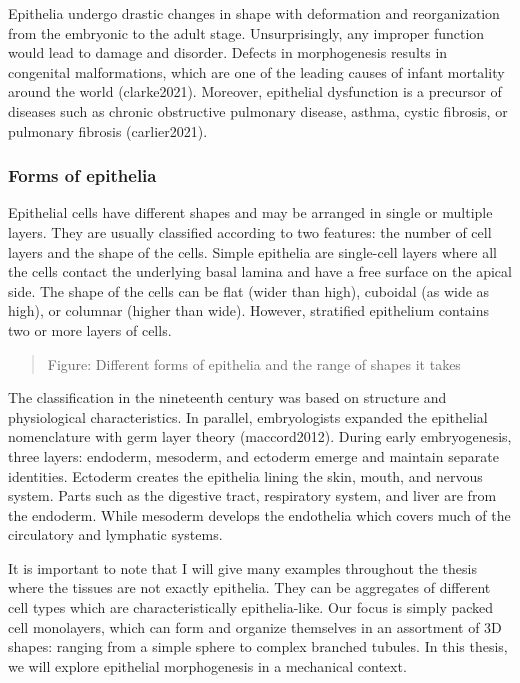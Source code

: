 \documentclass[
]{article}
\begin{document}
Epithelia undergo drastic changes in shape with deformation and
reorganization from the embryonic to the adult stage. Unsurprisingly,
any improper function would lead to damage and disorder. Defects in
morphogenesis results in congenital malformations, which are one of the
leading causes of infant mortality around the world (clarke2021).
Moreover, epithelial dysfunction is a precursor of diseases such as
chronic obstructive pulmonary disease, asthma, cystic fibrosis, or
pulmonary fibrosis (carlier2021).

\hypertarget{forms-of-epithelia}{%
\subsubsection{Forms of epithelia}\label{forms-of-epithelia}}

Epithelial cells have different shapes and may be arranged in single or
multiple layers. They are usually classified according to two features:
the number of cell layers and the shape of the cells. Simple epithelia
are single-cell layers where all the cells contact the underlying basal
lamina and have a free surface on the apical side. The shape of the
cells can be flat (wider than high), cuboidal (as wide as high), or
columnar (higher than wide). However, stratified epithelium contains two
or more layers of cells.

\begin{quote}
Figure: Different forms of epithelia and the range of shapes it takes
\end{quote}

The classification in the nineteenth century was based on structure and
physiological characteristics. In parallel, embryologists expanded the
epithelial nomenclature with germ layer theory (maccord2012). During
early embryogenesis, three layers: endoderm, mesoderm, and ectoderm
emerge and maintain separate identities. Ectoderm creates the epithelia
lining the skin, mouth, and nervous system. Parts such as the digestive
tract, respiratory system, and liver are from the endoderm. While
mesoderm develops the endothelia which covers much of the circulatory
and lymphatic systems.

It is important to note that I will give many examples throughout the
thesis where the tissues are not exactly epithelia. They can be
aggregates of different cell types which are characteristically
epithelia-like. Our focus is simply packed cell monolayers, which can
form and organize themselves in an assortment of 3D shapes: ranging from
a simple sphere to complex branched tubules. In this thesis, we will
explore epithelial morphogenesis in a mechanical context.
\end{document}
